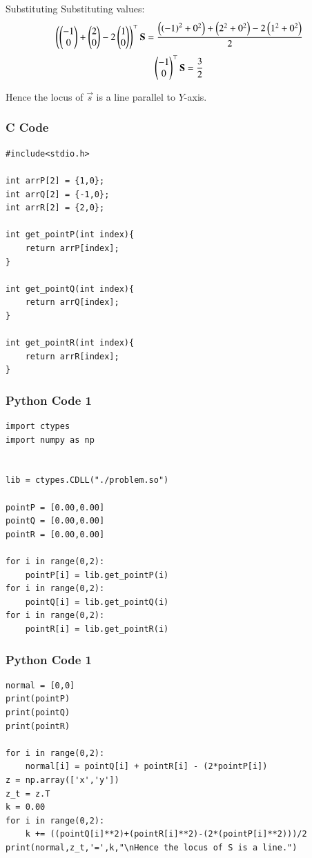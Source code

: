 \documentclass{beamer}
\begin{document}
\begin{frame}{Substituting}
Substituting values:
\begin{align}
    \begin{pmatrix}\begin{pmatrix}-1\\0\end{pmatrix}+\begin{pmatrix}2\\0\end{pmatrix}-2\begin{pmatrix}1\\0\end{pmatrix}\end{pmatrix}^\top\mathbf{S}= \frac{\left(\left(-1\right)^2+0^2\right)+\left(2^2+0^2\right)-2\left(1^2+0^2\right)}{2}
\end{align}
\begin{align}
    \begin{pmatrix}-1\\0\end{pmatrix}^\top\mathbf{S}=\frac{3}{2}
\end{align}

Hence the locus of $\vec{s}$ is a line parallel to $Y$-axis.
\end{frame}

\begin{frame}[fragile]
    \frametitle{C Code}
    \begin{lstlisting}
#include<stdio.h>

int arrP[2] = {1,0};
int arrQ[2] = {-1,0};
int arrR[2] = {2,0};

int get_pointP(int index){
    return arrP[index];
}

int get_pointQ(int index){
    return arrQ[index];
}

int get_pointR(int index){
    return arrR[index];
}
    \end{lstlisting}
\end{frame}

\begin{frame}[fragile]
    \frametitle{Python Code 1}
    \begin{lstlisting}
import ctypes
import numpy as np


lib = ctypes.CDLL("./problem.so")

pointP = [0.00,0.00]
pointQ = [0.00,0.00]
pointR = [0.00,0.00]

for i in range(0,2):
    pointP[i] = lib.get_pointP(i)
for i in range(0,2):
    pointQ[i] = lib.get_pointQ(i)
for i in range(0,2):
    pointR[i] = lib.get_pointR(i)
    \end{lstlisting}
\end{frame}

\begin{frame}[fragile]
    \frametitle{Python Code 1}
    \begin{lstlisting}
normal = [0,0]
print(pointP)
print(pointQ)
print(pointR)

for i in range(0,2):
    normal[i] = pointQ[i] + pointR[i] - (2*pointP[i])
z = np.array(['x','y'])
z_t = z.T
k = 0.00
for i in range(0,2):
    k += ((pointQ[i]**2)+(pointR[i]**2)-(2*(pointP[i]**2)))/2
print(normal,z_t,'=',k,"\nHence the locus of S is a line.")
    \end{lstlisting}
\end{frame}
\end{document}
